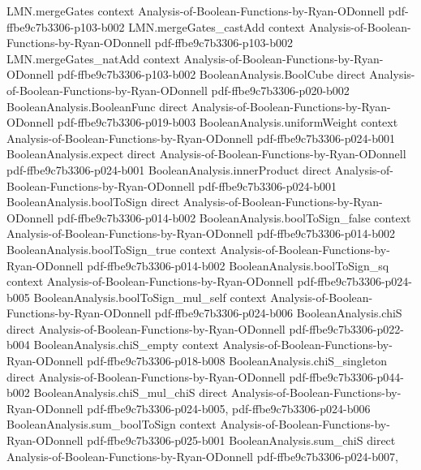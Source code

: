 \begin{lemma}
\proofstep
  {LMN.mergeGates}
  {context}
  {Analysis-of-Boolean-Functions-by-Ryan-ODonnell}
  {pdf-ffbe9c7b3306-p103-b002}
\proofstep
  {LMN.mergeGates_castAdd}
  {context}
  {Analysis-of-Boolean-Functions-by-Ryan-ODonnell}
  {pdf-ffbe9c7b3306-p103-b002}
\proofstep
  {LMN.mergeGates_natAdd}
  {context}
  {Analysis-of-Boolean-Functions-by-Ryan-ODonnell}
  {pdf-ffbe9c7b3306-p103-b002}
\proofstep
  {BooleanAnalysis.BoolCube}
  {direct}
  {Analysis-of-Boolean-Functions-by-Ryan-ODonnell}
  {pdf-ffbe9c7b3306-p020-b002}
\proofstep
  {BooleanAnalysis.BooleanFunc}
  {direct}
  {Analysis-of-Boolean-Functions-by-Ryan-ODonnell}
  {pdf-ffbe9c7b3306-p019-b003}
\proofstep
  {BooleanAnalysis.uniformWeight}
  {context}
  {Analysis-of-Boolean-Functions-by-Ryan-ODonnell}
  {pdf-ffbe9c7b3306-p024-b001}
\proofstep
  {BooleanAnalysis.expect}
  {direct}
  {Analysis-of-Boolean-Functions-by-Ryan-ODonnell}
  {pdf-ffbe9c7b3306-p024-b001}
\proofstep
  {BooleanAnalysis.innerProduct}
  {direct}
  {Analysis-of-Boolean-Functions-by-Ryan-ODonnell}
  {pdf-ffbe9c7b3306-p024-b001}
\proofstep
  {BooleanAnalysis.boolToSign}
  {direct}
  {Analysis-of-Boolean-Functions-by-Ryan-ODonnell}
  {pdf-ffbe9c7b3306-p014-b002}
\proofstep
  {BooleanAnalysis.boolToSign_false}
  {context}
  {Analysis-of-Boolean-Functions-by-Ryan-ODonnell}
  {pdf-ffbe9c7b3306-p014-b002}
\proofstep
  {BooleanAnalysis.boolToSign_true}
  {context}
  {Analysis-of-Boolean-Functions-by-Ryan-ODonnell}
  {pdf-ffbe9c7b3306-p014-b002}
\proofstep
  {BooleanAnalysis.boolToSign_sq}
  {context}
  {Analysis-of-Boolean-Functions-by-Ryan-ODonnell}
  {pdf-ffbe9c7b3306-p024-b005}
\proofstep
  {BooleanAnalysis.boolToSign_mul_self}
  {context}
  {Analysis-of-Boolean-Functions-by-Ryan-ODonnell}
  {pdf-ffbe9c7b3306-p024-b006}
\proofstep
  {BooleanAnalysis.chiS}
  {direct}
  {Analysis-of-Boolean-Functions-by-Ryan-ODonnell}
  {pdf-ffbe9c7b3306-p022-b004}
\proofstep
  {BooleanAnalysis.chiS_empty}
  {context}
  {Analysis-of-Boolean-Functions-by-Ryan-ODonnell}
  {pdf-ffbe9c7b3306-p018-b008}
\proofstep
  {BooleanAnalysis.chiS_singleton}
  {direct}
  {Analysis-of-Boolean-Functions-by-Ryan-ODonnell}
  {pdf-ffbe9c7b3306-p044-b002}
\proofstep
  {BooleanAnalysis.chiS_mul_chiS}
  {direct}
  {Analysis-of-Boolean-Functions-by-Ryan-ODonnell}
  {pdf-ffbe9c7b3306-p024-b005,
    pdf-ffbe9c7b3306-p024-b006}
\proofstep
  {BooleanAnalysis.sum_boolToSign}
  {context}
  {Analysis-of-Boolean-Functions-by-Ryan-ODonnell}
  {pdf-ffbe9c7b3306-p025-b001}
\proofstep
  {BooleanAnalysis.sum_chiS}
  {direct}
  {Analysis-of-Boolean-Functions-by-Ryan-ODonnell}
  {pdf-ffbe9c7b3306-p024-b007,
}
\end{lemma}

